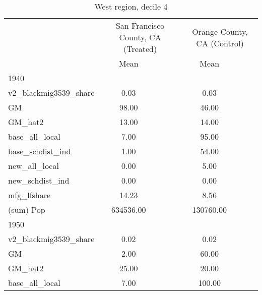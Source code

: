 \begin{table}[htbp]\centering
\def\sym#1{\ifmmode^{#1}\else\(^{#1}\)\fi}
\caption{West region, decile 4 \label{tab1}}
\begin{tabular}{l*{2}{ccc}}
\toprule
                    &\multicolumn{3}{c}{San Francisco County, CA (Treated)}&\multicolumn{3}{c}{Orange County, CA (Control)}\\
                    &        Mean&            &            &        Mean&            &            \\
\midrule
1940                &            &            &            &            &            &            \\
v2\_blackmig3539\_share&        0.03&            &            &        0.03&            &            \\
GM                  &       98.00&            &            &       46.00&            &            \\
GM\_hat2             &       13.00&            &            &       14.00&            &            \\
base\_all\_local      &        7.00&            &            &       95.00&            &            \\
base\_schdist\_ind    &        1.00&            &            &       54.00&            &            \\
new\_all\_local       &        0.00&            &            &        5.00&            &            \\
new\_schdist\_ind     &        0.00&            &            &        0.00&            &            \\
mfg\_lfshare         &       14.23&            &            &        8.56&            &            \\
(sum) Pop           &   634536.00&            &            &   130760.00&            &            \\
\midrule
1950                &            &            &            &            &            &            \\
v2\_blackmig3539\_share&        0.02&            &            &        0.02&            &            \\
GM                  &        2.00&            &            &       60.00&            &            \\
GM\_hat2             &       25.00&            &            &       20.00&            &            \\
base\_all\_local      &        7.00&            &            &      100.00&            &            \\

\end{tabular}
\end{table}
